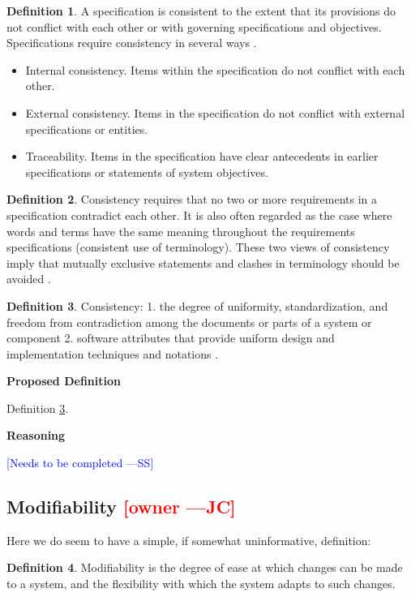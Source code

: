 \documentclass[letterpaper,cleveref]{lipics-v2019}
\newcommand{\authornote}[3]{\textcolor{#1}{[#3 ---#2]}}
\newcommand{\authornote}[3]{}
\newcommand{\wss}[1]{\authornote{blue}{SS}{#1}} %
\newcommand{\jc}[1]{\authornote{red}{JC}{#1}} %
\theoremstyle{definition}
\newtheorem{defn}{Definition}
\begin{document}
\begin{defn}
A specification is consistent to the extent that its provisions do not conflict
with each other or with governing specifications and objectives. Specifications
require consistency in several ways \citep{Boehm1984}.
\begin{itemize}
\item Internal consistency. Items within the specification do not conflict with
each other.
\item External consistency. Items in the specification do not conflict with
external specifications or entities.
\item Traceability. Items in the specification have clear antecedents in earlier
specifications or statements of system objectives.
\end{itemize}
\end{defn}
\begin{defn}
Consistency requires that no two or more requirements in a specification
contradict each other. It is also often regarded as the case where words and
terms have the same meaning throughout the requirements specifications
(consistent use of terminology). These two views of consistency imply that
mutually exclusive statements and clashes in terminology should be avoided
\citep{ZOWGHI2003}.
\end{defn}
\begin{defn}
\label{ConsistencySelected}
Consistency: 1. the degree of uniformity, standardization, and freedom from
contradiction among the documents or parts of a system or component 2. software
attributes that provide uniform design and implementation techniques and
notations \citep{ISO/IEC/IEEE24765}.
\end{defn}

\noindent \textbf{Proposed Definition} 

Definition \ref{ConsistencySelected}.

\noindent \textbf{Reasoning}

\wss{Needs to be completed}

\subsection{Modifiability \jc{owner}}

Here we do seem to have a simple, if somewhat uninformative, definition:

\begin{defn}
Modifiability is the degree of ease at which changes can be made to a system,
and the flexibility with which the system adapts to such changes.
\end{defn}
\end{document}
